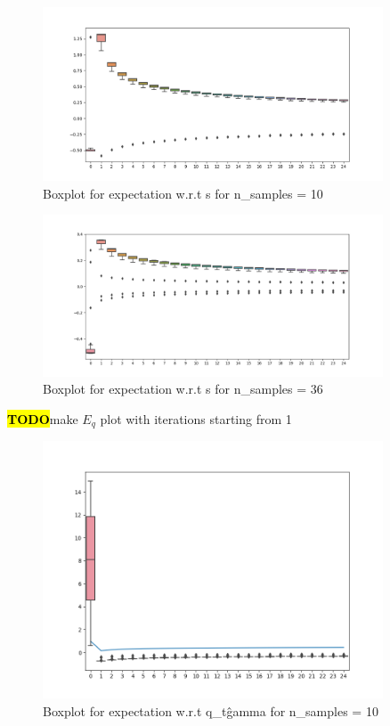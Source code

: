 \documentclass[letterpaper]{article}
\newcommand{\TODO}{\hl{\textbf{TODO}}}
\begin{document}
  \begin{figure}[h] \label{fig:es10}
    \centering
    \includegraphics[width=0.9\textwidth]{plots/box_e_s_10.png}
    \caption{Boxplot for expectation w.r.t s for n\_samples = 10}
  \end{figure}
  \begin{figure}[h] \label{fig:es35}
  \centering
  \includegraphics[width=0.9\textwidth]{plots/box_e_s_35.png}
  \caption{Boxplot for expectation w.r.t s for n\_samples = 36}
  \end{figure}
  \TODO make $E_q$ plot with iterations starting from 1
  \begin{figure}[h] \label{fig:eq10}
    \centering
    \includegraphics[width=0.9\textwidth]{plots/box_e_q_10.png}
    \caption{Boxplot for expectation w.r.t q\_t\^gamma for n\_samples = 10}
  \end{figure}
\end{document}
